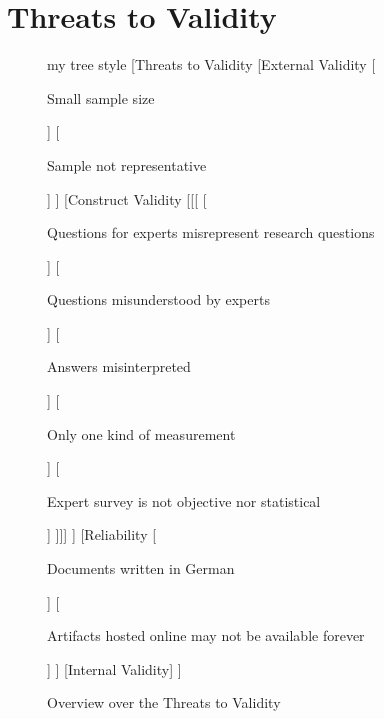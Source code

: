 \section{Threats to Validity}
\label{sec:ch5:s4}

\begin{figure}[!h]
	\centering
	\begin{forest}
	my tree style
	[Threats to Validity
      [External Validity
	    [\begin{varwidth}{0.16\linewidth}Small sample size\end{varwidth}]
	    [\begin{varwidth}{0.16\linewidth}Sample not representative\end{varwidth}]
	  ]
	  [Construct Validity 
	    [[[
	      [\begin{varwidth}{0.16\linewidth}Questions for experts misrepresent research questions\end{varwidth}]
	      [\begin{varwidth}{0.16\linewidth}Questions misunderstood by experts\end{varwidth}]
	      [\begin{varwidth}{0.16\linewidth}Answers misinterpreted\end{varwidth}]
	      [\begin{varwidth}{0.16\linewidth}Only one kind of measurement\end{varwidth}]
	      [\begin{varwidth}{0.16\linewidth}Expert survey is not objective nor statistical\end{varwidth}]
	    ]]]
	  ]
	  [Reliability
	      [\begin{varwidth}{0.16\linewidth}Documents written in German\end{varwidth}]
	      [\begin{varwidth}{0.16\linewidth}Artifacts hosted online may not be available forever\end{varwidth}]
	  ]
	  [Internal Validity]
	]
	\end{forest}
  
	\caption{Overview over the Threats to Validity}
	\label{fig:threatsToValididty}
\end{figure}

